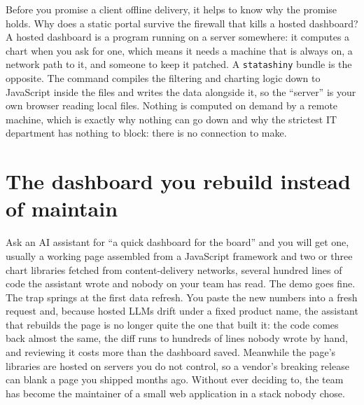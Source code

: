 Before you promise a client offline delivery, it helps to know why the promise holds. Why does a static portal survive the firewall that kills a hosted dashboard? A hosted dashboard is a program running on a server somewhere: it computes a chart when you ask for one, which means it needs a machine that is always on, a network path to it, and someone to keep it patched. A \texttt{statashiny} bundle is the opposite. The command compiles the filtering and charting logic down to JavaScript inside the files and writes the data alongside it, so the \enquote{server} is your own browser reading local files. Nothing is computed on demand by a remote machine, which is exactly why nothing can go down and why the strictest IT department has nothing to block: there is no connection to make.

\section{The dashboard you rebuild instead of maintain}\label{sec:dashboardbuilder}
Ask an AI assistant for \enquote{a quick dashboard for the board} and you will get one, usually a working page assembled from a JavaScript framework and two or three chart libraries fetched from content-delivery networks, several hundred lines of code the assistant wrote and nobody on your team has read. The demo goes fine. The trap springs at the first data refresh. You paste the new numbers into a fresh request and, because hosted LLMs drift under a fixed product name, the assistant that rebuilds the page is no longer quite the one that built it: the code comes back almost the same, the diff runs to hundreds of lines nobody wrote by hand, and reviewing it costs more than the dashboard saved. Meanwhile the page's libraries are hosted on servers you do not control, so a vendor's breaking release can blank a page you shipped months ago. Without ever deciding to, the team has become the maintainer of a small web application in a stack nobody chose.

